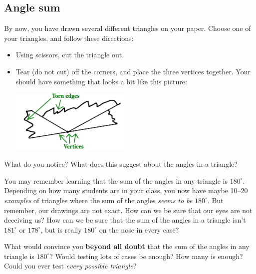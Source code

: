 \newpage


\subsection{Angle sum}

\begin{thinkpair*}
By now, you have drawn several different triangles on your paper.  Choose one of your triangles, and follow these directions:
\begin{itemize}
\item
Using scissors, cut the triangle out.  \\
\item
Tear (do not cut) off the corners, and place the three vertices together.  Your should have something that looks a bit like this picture:\\
\begin{center}
\includegraphics[height=3cm]{anglesum}
\end{center}
\end{itemize}
  What do you notice?  What does this suggest about the angles in a triangle? 
  \end{thinkpair*}
  
  
  
\bigskip
\bigskip
\bigskip

You may remember learning that the sum of the angles in any triangle is $180^\circ$.  Depending on how many students are in your class, you now have maybe 10--20 \emph{examples} of triangles where the sum of the angles \emph{seems to be} $180^\circ$.  But remember, our drawings are not exact.  How can we be sure that our eyes are not deceiving us?  How can we be sure that the sum of the angles in a triangle isn't   $181^\circ$ or $178^\circ$, but is really $180^\circ$ on the nose in every case?

\bigskip
\bigskip

\begin{thinkpair*}
What would convince you {\bf beyond all doubt} that the sum of the angles in any triangle is $180^\circ$?  Would testing lots of cases be enough?  How many is enough?  Could you ever test \emph{every possible triangle}?
\end{thinkpair*}

